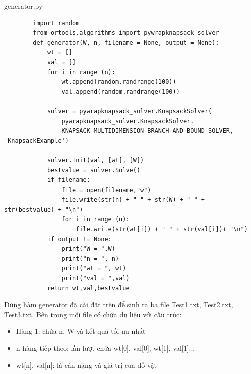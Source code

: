 \documentclass[12pt,a4paper]{report}
\begin{document}
    generator.py
    \begin{lstlisting}
        import random
        from ortools.algorithms import pywrapknapsack_solver
        def generator(W, n, filename = None, output = None):
            wt = []
            val = []
            for i in range (n):
                wt.append(random.randrange(100))
                val.append(random.randrange(100))
        
            solver = pywrapknapsack_solver.KnapsackSolver(
                pywrapknapsack_solver.KnapsackSolver.
                KNAPSACK_MULTIDIMENSION_BRANCH_AND_BOUND_SOLVER, 'KnapsackExample')
        
            solver.Init(val, [wt], [W])
            bestvalue = solver.Solve()
            if filename:
                file = open(filename,"w")
                file.write(str(n) + " " + str(W) + " " + str(bestvalue) + "\n")
                for i in range (n):
                    file.write(str(wt[i]) + " " + str(val[i])+ "\n")
            if output != None:
                print("W = ",W)
                print("n = ", n)
                print("wt = ", wt)
                print("val = ",val)
            return wt,val,bestvalue
    \end{lstlisting}
    Dùng hàm generator đã cài đặt trên để sinh ra ba file Test1.txt, Test2.txt,
    Test3.txt. Bên trong mỗi file có chứa dữ liệu với cấu trúc:
    \begin{itemize}
        \item Hàng 1: chứa n, W và kết quả tối ưu nhất
        \item n hàng tiếp theo: lần lượt chứa wt[0], val[0], wt[1], val[1]... 
        \item wt[n], val[n]: là cân nặng và giá trị của đồ vật
    \end{itemize}
\end{document}
